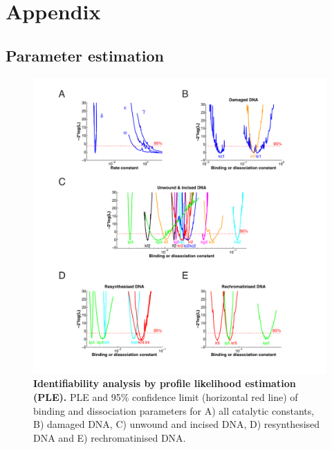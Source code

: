 \appendix
\chapter{Appendix}
\pagestyle{plain4}
\setcounter{table}{0}
\renewcommand{\thetable}{A\arabic{table}}

\section{Parameter estimation}


\begin{figure}[h!]
\begin{center}
\includegraphics[width=1\textwidth]{Abbildungen/figure_A_1.pdf}
\caption{\textbf{Identifiability analysis by profile likelihood estimation (PLE).} PLE and 95\% confidence limit (horizontal red line) of binding and dissociation parameters for A) all catalytic constants, B) damaged DNA, C) unwound and incised DNA, D) resynthesised DNA and E) rechromatinised DNA. }
\label{fig:profileLikilihoods}
\end{center}
\end{figure}

